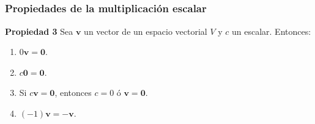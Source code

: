 
\subsection{}

\begin{frame}\frametitle{Propiedades de la multiplicación escalar}

\begin{prop}{\textbf{Propiedad 3}}
	\justifying
	Sea $\mathbf{v}$ un vector de un espacio vectorial $V$ y $c$ un escalar. Entonces:
	\begin{enumerate}
		\item[\labelname{$a$}] $0\mathbf{v} = \mathbf{0}$.
		\item[\labelname{$b$}] $c \mathbf{0} = \mathbf{0}$.
		\item[\labelname{$c$}] Si $c \mathbf{v} = \mathbf{0}$, entonces $c=0$ ó $\mathbf{v} = \mathbf{0}$.
		\item[\labelname{$d$}] $(-1)\mathbf{v} = -\mathbf{v}$.
	\end{enumerate}
\end{prop}

\end{frame}
